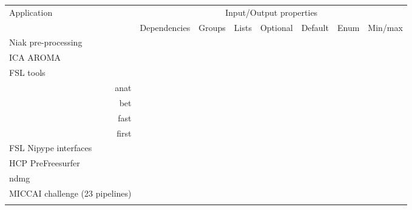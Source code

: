 \documentclass{article}
\begin{document}
\begin{table}
  \begin{tabular}{l|ccccccc}
    \rowcolor[gray]{0.9}
    Application                      & \multicolumn{7}{c}{Input/Output properties} \\
    \rowcolor[gray]{0.9}
                                     & Dependencies      &Groups             & Lists             & Optional          &Default            & Enum              & Min/max\\
    
    \hline
    Niak pre-processing              &                   &\cellcolor{gray!75}&\cellcolor{gray!75}&\cellcolor{gray!75}&\cellcolor{gray!75}&\\
    ICA AROMA                        &\cellcolor{gray!75}&\cellcolor{gray!75}&                   &\cellcolor{gray!75}&\cellcolor{gray!75}&\cellcolor{gray!75}&\cellcolor{gray!75}\\
    FSL tools &&&&&&\\
    \multicolumn{1}{r|}{anat}        &\cellcolor{gray!75}&\cellcolor{gray!75}&                   &\cellcolor{gray!75}&\cellcolor{gray!75}&\cellcolor{gray!75}&\cellcolor{gray!75}\\
    \multicolumn{1}{r|}{bet}         &\cellcolor{gray!75}&\cellcolor{gray!75}&\cellcolor{gray!75}&\cellcolor{gray!75}&                   &                   &\cellcolor{gray!75}\\      
    \multicolumn{1}{r|}{fast}        &\cellcolor{gray!75}&                   &                   &\cellcolor{gray!75}&\cellcolor{gray!75}&\cellcolor{gray!75}&\cellcolor{gray!75}\\
    \multicolumn{1}{r|}{first}       &                   &                   &\cellcolor{gray!75}&\cellcolor{gray!75}&\cellcolor{gray!75}&                   &                   \\
    FSL Nipype interfaces     \\
    HCP PreFreesurfer                &                   &                   &                   &                   &                   &                   &                   \\
    ndmg                &                   &       \cellcolor{gray!75}            &                   &          \cellcolor{gray!75}         &      \cellcolor{gray!75}             &                   &                   \\
    MICCAI challenge (23 pipelines)\\&                   &                   &                   &                   &                   &                   & \\

\end{tabular}
\end{table}
\end{document}
